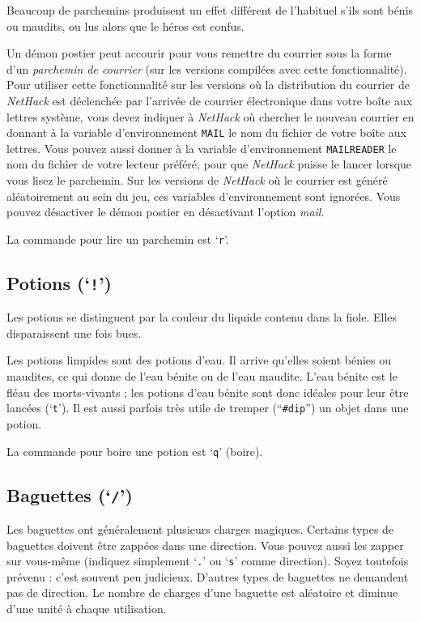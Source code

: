 \documentclass[titlepage]{article}
\begin{document}
Beaucoup de parchemins produisent un effet différent de l'habituel s'ils sont bénis ou
maudits, ou lus alors que le héros est confus.

Un démon postier peut accourir pour vous remettre du courrier sous la forme d'un %
\textit{parchemin de courrier} (sur les versions compilées avec cette fonctionnalité).
Pour utiliser cette fonctionnalité sur les versions où la distribution du courrier de \textit{NetHack}
est déclenchée par l'arrivée de courrier électronique dans votre boîte aux lettres système,
vous devez indiquer à \textit{NetHack} où chercher le nouveau courrier en donnant à la
variable d'environnement \texttt{MAIL} le nom du fichier de votre boîte aux lettres.
Vous pouvez aussi donner à la variable d'environnement \texttt{MAILREADER} le
nom du fichier de votre lecteur préféré, pour que \textit{NetHack} puisse le lancer lorsque vous
lisez le parchemin.
Sur les versions de \textit{NetHack} où le courrier est généré aléatoirement
au sein du jeu, ces variables d'environnement sont ignorées.
Vous pouvez désactiver le démon postier en désactivant
l'option \textit{mail}.

La commande pour lire un parchemin est `\texttt{r}'.

\subsection*{Potions (`\texttt{!}')}

Les potions se distinguent par la couleur du liquide contenu dans la fiole.
Elles disparaissent une fois bues.

Les potions limpides sont des potions d'eau.  Il arrive qu'elles soient
bénies ou maudites, ce qui donne de l'eau bénite ou de l'eau maudite.  L'eau bénite est
le fléau des morts-vivants ; les potions d'eau bénite sont donc idéales pour leur
être lancées (`\texttt{t}').  Il est aussi parfois très utile de tremper
(``\texttt{\#dip}'') un objet dans une potion.

La commande pour boire une potion est `\texttt{q}' (boire).

\subsection*{Baguettes (`\texttt{/}')}

Les baguettes ont généralement plusieurs charges magiques.
Certains types de baguettes doivent être zappées dans une direction.
Vous pouvez aussi
les zapper sur vous-même (indiquez simplement `\texttt{.}' ou `\texttt{s}' comme direction).
Soyez toutefois prévenu : c'est souvent peu judicieux.
D'autres types de baguettes
ne demandent pas de direction.  Le nombre de charges d'une
baguette est aléatoire et diminue d'une unité à chaque utilisation.
\end{document}
